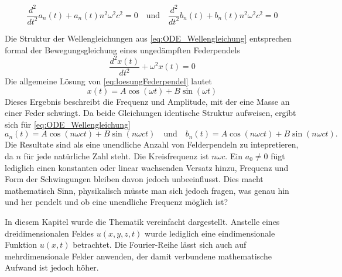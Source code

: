 \begin{equation}\label{eq:ODE_Wellengleichung}
	\frac{d^2}{dt^2} a_n(t) + a_n(t) n^2 \omega^2 c^2 = 0
	  \quad   \text{und} \quad  \frac{d^2}{dt^2} b_n(t) + b_n(t) n^2 \omega^2 c^2 = 0
\end{equation}

Die Struktur der Wellengleichungen aus \eqref{eq:ODE_Wellengleichung} entsprechen formal der Bewegungsgleichung eines ungedämpften Federpendels  
\begin{equation}\label{eq:loesungFederpendel}
	\frac{d^2 x(t)}{d t^2} + \omega^2 x(t) = 0
\end{equation}
Die allgemeine Lösung von \eqref{eq:loesungFederpendel} lautet  
\begin{equation}
	x(t) = A \cos(\omega t) + B \sin(\omega t)
\end{equation}
Dieses Ergebnis beschreibt die Frequenz und Amplitude, mit der eine Masse an einer Feder schwingt.  
Da beide Gleichungen identische Struktur aufweisen, ergibt sich für \eqref{eq:ODE_Wellengleichung} 
\begin{equation}
	a_n(t) = A \cos(n \omega c t) + B \sin(n \omega c t)
	\quad\text{und}\quad
	b_n(t) = A \cos(n \omega c t) + B \sin(n \omega c t).
\end{equation}
Die Resultate sind als eine unendliche Anzahl von Felderpendeln zu intepretieren, da $n$ für jede natürliche Zahl steht. 
Die Kreisfrequenz ist $n \omega c$. 
Ein $a_0\neq0$ fügt lediglich einen konstanten oder linear wachsenden Versatz hinzu, Frequenz und Form der Schwingungen bleiben davon jedoch unbeeinflusst.
Dies macht mathematisch Sinn, physikalisch müsste man sich jedoch fragen, was genau hin und her pendelt und ob eine unendliche Frequenz möglich ist?



In diesem Kapitel wurde die Thematik vereinfacht dargestellt. 
Anstelle eines dreidimensionalen Feldes $u(x,y,z,t)$ wurde lediglich eine eindimensionale Funktion $u(x,t)$ betrachtet. Die Fourier-Reihe lässt sich auch auf mehrdimensionale Felder anwenden, der damit verbundene mathematische Aufwand ist jedoch höher. 








